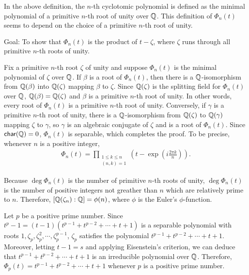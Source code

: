 \begin{rmk}
    In the above definition, the $n$-th cyclotomic polynomial is defined as the minimal polynomial of a primitive $n$-th root of unity over ${\mathbb{Q}}$.
    This definition of $\Phi_n(t)$ seems to depend on the choice of a primitive $n$-th root of unity.
    \begin{center}
        Goal: To show that $\Phi_n(t)$ is the product of $t-\zeta$, where $\zeta$ runs through all primitive $n$-th roots of unity.
    \end{center}
    
    Fix a primitive $n$-th root $\zeta$ of unity and suppose $\Phi_n(t)$ is the minimal polynomial of $\zeta$ over ${\mathbb{Q}}$.
    If $\beta$ is a root of $\Phi_n(t)$, then there is a ${\mathbb{Q}}$-isomorphism from ${\mathbb{Q}}(\beta)$ into ${\mathbb{Q}}(\zeta)$ mapping $\beta$ to $\zeta$.
    Since ${\mathbb{Q}}(\zeta)$ is the splitting field for $\Phi_n(t)$ over ${\mathbb{Q}}$, ${\mathbb{Q}}(\beta)={\mathbb{Q}}(\zeta)$ and $\beta$ is a primitive $n$-th root of unity.
    In other words, every root of $\Phi_n(t)$ is a primitive $n$-th root of unity.
    Conversely, if $\gamma$ is a primitive $n$-th root of unity, there is a ${\mathbb{Q}}$-isomorphism from ${\mathbb{Q}}(\zeta)$ to ${\mathbb{Q}}(\gamma)$ mapping $\zeta$ to $\gamma$, so $\gamma$ is an algebraic conjugate of $\zeta$ and is a root of $\Phi_n(t)$.
    Since ${\textsf{char}({{\mathbb{Q}}})}=0$, $\Phi_n(t)$ is separable, which completes the proof.
    To be precise, whenever $n$ is a positive integer,
    \begin{align*}
        \Phi_n(t)=\prod_{\substack{1\leq k\leq n\\(n, k)=1}}\left(t-\exp\left(i\frac{2\pi k}{n}\right)\right).
    \end{align*}

    Because $\deg\Phi_n(t)$ is the number of primitive $n$-th roots of unity, $\deg\Phi_n(t)$ is the number of positive integers not greather than $n$ which are relatively prime to $n$.
    Therefore, $[{\mathbb{Q}}(\zeta_n):{\mathbb{Q}}]=\phi(n)$, where $\phi$ is the Euler's $\phi$-function.
\end{rmk}
\begin{exmp}
    Let $p$ be a positive prime number.
    Since $t^p-1=(t-1)(t^{p-1}+t^{p-2}+\cdots+t+1)$ is a separable polynomial with roots $1, \zeta_p, \zeta_p^2, \cdots, \zeta_p^{p-1}$, $\zeta_p$ satisfies the polynomial $t^{p-1}+t^{p-2}+\cdots+t+1$.
    Moreover, letting $t-1=s$ and applying Eisenstein's criterion, we can deduce that $t^{p-1}+t^{p-2}+\cdots+t+1$ is an irreducible polynomial over ${\mathbb{Q}}$.
    Therefore, $\Phi_p(t)=t^{p-1}+t^{p-2}+\cdots+t+1$ whenever $p$ is a positive prime number.
\end{exmp}
